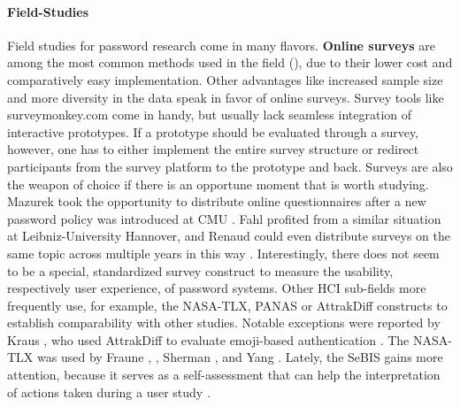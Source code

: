 \paragraph{Field-Studies}
Field studies for password research come in many flavors. 
\textbf{Online surveys} are among the most common methods used in the field (\cite{Gaw2005ReuseRecycle,Halevi2013PilotStudyPersonality,Haque2014Hierarchy,Huh2017TooBusy, Kuo2006HumanSelectionMnemonic,Mazurek2013Measuring,Riley2006WhatUsersKnowWhatTheyDo, Violettas2014PasswordsAvoidGreece}), due to their lower cost and comparatively easy implementation. Other advantages like increased sample size and more diversity in the data speak in favor of online surveys. Survey tools like surveymonkey.com come in handy, but usually lack seamless integration of interactive prototypes. If a prototype should be evaluated through a survey, however, one has to either implement the entire survey structure or redirect participants from the survey platform to the prototype and back. Surveys are also the weapon of choice if there is an opportune moment that is worth studying. Mazurek \etal took the opportunity to distribute online questionnaires after a new password policy was introduced at \acrshort{CMU} \cite{Mazurek2013Measuring}. Fahl \etal profited from a similar situation at Leibniz-University Hannover, and Renaud \etal could even distribute surveys on the same topic across multiple years in this way \cite{Renaud2017LessonsLearnedNudges}. Interestingly, there does not seem to be a special, standardized survey construct to measure the usability, respectively user experience, of password systems. Other \gls{HCI} sub-fields more frequently use, for example, the NASA-TLX, \gls{PANAS} or AttrakDiff constructs to establish comparability with other studies. Notable exceptions were reported by Kraus \etal, who used AttrakDiff to evaluate emoji-based authentication \cite{Kraus2017Emoji}. The NASA-TLX was used by Fraune \etal, \cite{Fraune2013UserCreatedPictures}, Sherman \etal \cite{Sherman2014UserGeneratedGesturesAuth}, and Yang \etal \cite{Yang2014EntryAffectsPasswordSecurity}. Lately, the \gls{SeBIS} gains more attention, because it serves as a self-assessment that can help the interpretation of actions taken during a user study  \cite{Egelman2015SeBIS, Egelman2016BehaviorEverFollows, Wash2016UnderstandingPasswordChoices,Wash2017SelfReport}.

